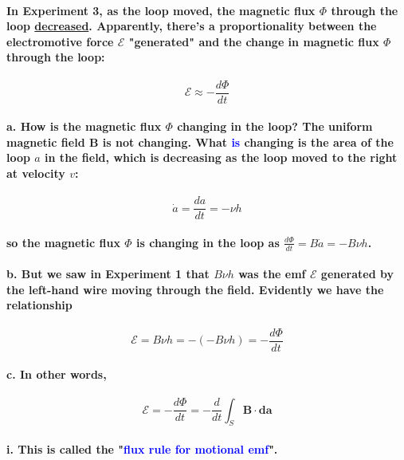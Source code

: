 \documentclass{article}
\begin{document}
\paragraph{In Experiment 3, as the loop moved, the magnetic flux $\Phi$ through the loop \underline{decreased}. Apparently, there's a proportionality between the electromotive force $\mathcal{E}$ "generated" and the change in magnetic flux $\Phi$ through the loop:}
\begin{equation*}
    \mathcal{E}\approx-\frac{d\Phi}{dt}
\end{equation*}
\paragraph{\indent a. How is the magnetic flux $\Phi$ changing in the loop? The uniform magnetic field $\boldsymbol{B}$ is not changing. What \textcolor{blue}{is} changing is the area of the loop $a$ in the field, which is decreasing as the loop moved to the right at velocity $v$:}
\begin{equation*}
    \dot{a}=\frac{da}{dt}=-\nu h
\end{equation*}
\paragraph{\indent so the magnetic flux $\Phi$ is changing in the loop as $\frac{d\Phi}{dt}=B\dot{a}=-B\nu h$.}
\paragraph{\indent b. But we saw in Experiment 1 that $B\nu h$ was the emf $\mathcal{E}$ generated by the left-hand wire moving through the field. Evidently we have the relationship}
\begin{equation*}
    \mathcal{E}=B\nu h=-(-B\nu h)=-\frac{d\Phi}{dt}
\end{equation*}
\paragraph{\indent c. In other words,}
\begin{equation*}
    \mathcal{E}=-\frac{d\Phi}{dt}=-\frac{d}{dt}\int_S\boldsymbol{B}\cdot\boldsymbol{da}
\end{equation*}
\paragraph{\indent\indent i. This is called the "\textcolor{blue}{flux rule for motional emf}".}
\end{document}
